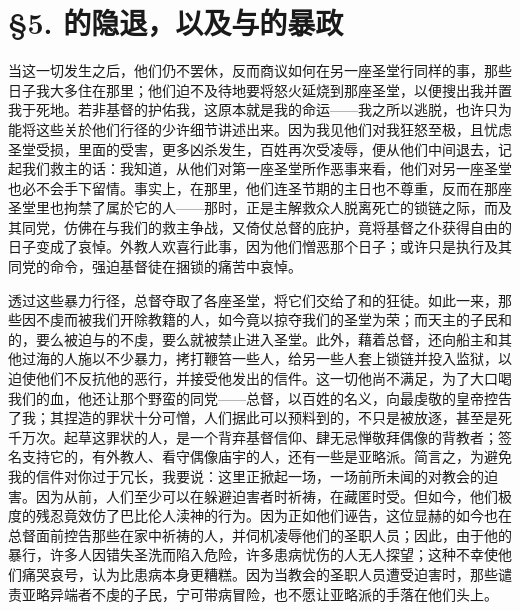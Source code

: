 
\section{§5. 的隐退，以及与的暴政}

当这一切发生之后，他们仍不罢休，反而商议如何在另一座圣堂行同样的事，那些日子我大多住在那里；他们迫不及待地要将怒火延烧到那座圣堂，以便搜出我并置我于死地。若非基督的护佑我，这原本就是我的命运——我之所以逃脱，也许只为能将这些关於他们行径的少许细节讲述出来。因为我见他们对我狂怒至极，且忧虑圣堂受损，里面的受害，更多凶杀发生，百姓再次受凌辱，便从他们中间退去，记起我们救主的话：我知道，从他们对第一座圣堂所作恶事来看，他们对另一座圣堂也必不会手下留情。事实上，在那里，他们连圣节期的主日也不尊重，反而在那座圣堂里也拘禁了属於它的人——那时，正是主解救众人脱离死亡的锁链之际，而及其同党，仿佛在与我们的救主争战，又倚仗总督的庇护，竟将基督之仆获得自由的日子变成了哀悼。外教人欢喜行此事，因为他们憎恶那个日子；或许只是执行及其同党的命令，强迫基督徒在捆锁的痛苦中哀悼。\par

透过这些暴力行径，总督夺取了各座圣堂，将它们交给了和的狂徒。如此一来，那些因不虔而被我们开除教籍的人，如今竟以掠夺我们的圣堂为荣；而天主的子民和的，要么被迫与的不虔，要么就被禁止进入圣堂。此外，藉着总督，还向船主和其他过海的人施以不少暴力，拷打鞭笞一些人，给另一些人套上锁链并投入监狱，以迫使他们不反抗他的恶行，并接受他发出的信件。这一切他尚不满足，为了大口喝我们的血，他还让那个野蛮的同党——总督，以百姓的名义，向最虔敬的皇帝控告了我；其捏造的罪状十分可憎，人们据此可以预料到的，不只是被放逐，甚至是死千万次。起草这罪状的人，是一个背弃基督信仰、肆无忌惮敬拜偶像的背教者；签名支持它的，有外教人、看守偶像庙宇的人，还有一些是亚略派。简言之，为避免我的信件对你过于冗长，我要说：这里正掀起一场，一场前所未闻的对教会的迫害。因为从前，人们至少可以在躲避迫害者时祈祷，在藏匿时受。但如今，他们极度的残忍竟效仿了巴比伦人渎神的行为。因为正如他们诬告，这位显赫的如今也在总督面前控告那些在家中祈祷的人，并伺机凌辱他们的圣职人员；因此，由于他的暴行，许多人因错失圣洗而陷入危险，许多患病忧伤的人无人探望；这种不幸使他们痛哭哀号，认为比患病本身更糟糕。因为当教会的圣职人员遭受迫害时，那些谴责亚略异端者不虔的子民，宁可带病冒险，也不愿让亚略派的手落在他们头上。\par

